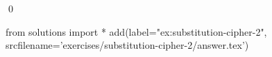 
\begin{ex} 
  \label{ex:substitution-cipher-2}
  
  \qed
\end{ex} 
\begin{python0}
from solutions import *
add(label="ex:substitution-cipher-2",
    srcfilename='exercises/substitution-cipher-2/answer.tex') 
\end{python0}
